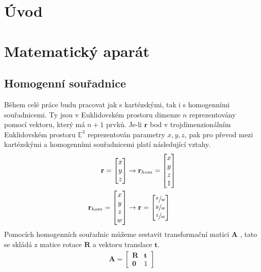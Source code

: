 \documentclass[twoside]{ctuthesis}
\newcommand{\tl}[1]{$\mathbf{#1}$}
\begin{document}
\maketitle

\chapter{Úvod}
\chapter{Matematický aparát}
\section{Homogenní souřadnice}
Během celé práce budu pracovat jak s kartézskými, tak i s homogenními souřadnicemi. Ty jsou v Euklidovském prostoru dimenze $n$ reprezentovány pomocí vektoru, který má $n+1$ prvků. Je-li $\boldsymbol{r}$ bod v trojdimenzionálním Euklidovském prostoru $\mathbb{E}^3$ reprezentován parametry $x,y,z$, pak pro převod mezi kartézskými a homogenními souřadnicemi platí následující vztahy.
\begin{align}
    \mathbf{r} = \begin{bmatrix} x \\ y \\ z \end{bmatrix} &\rightarrow \mathbf{r}_{hom} = \begin{bmatrix} x \\ y \\ z \\ 1 \end{bmatrix} \\
    \mathbf{r}_{hom} = \begin{bmatrix} x \\ y \\ z \\ w \end{bmatrix} &\rightarrow \mathbf{r} = \begin{bmatrix} \sfrac{x}{w} \\ \sfrac{y}{w} \\ \sfrac{z}{w} \end{bmatrix}
\end{align}
Pomocích homogenních souřadnic můžeme sestavit transformační matici \tl{A} , tato se skládá z matice rotace \tl{R} a vektoru translace \tl{t}.
\begin{align}
    \mathbf{A} = \begin{bmatrix} \mathbf{R} & \mathbf{t} \\ \mathbf{0} & 1 \end{bmatrix}
\end{align}
\end{document}
